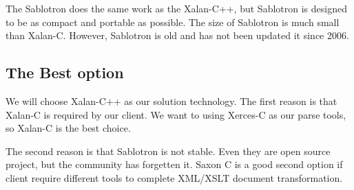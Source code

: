 The Sablotron does the same work as the Xalan-C++, but Sablotron is designed to be as compact and portable as possible.
The size of Sablotron is much small than Xalan-C.
However, Sablotron is old and has not been updated it since 2006.

\subsection{The Best option}

We will choose Xalan-C++ as our solution technology.
The first reason is that Xalan-C is required by our client.
We want to using Xerces-C as our parse tools, so Xalan-C is the best choice.

The second reason is that Sablotron is not stable.
Even they are open source project, but the community has forgetten it.
Saxon C is a good second option if client require different tools to complete XML/XSLT document transformation.
